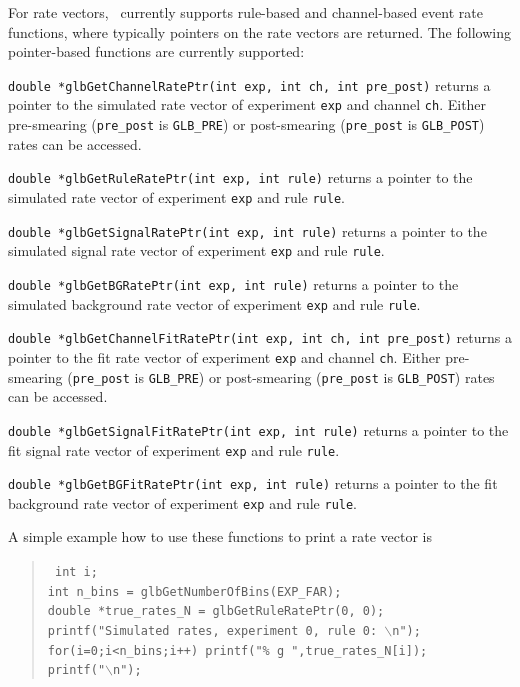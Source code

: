 For rate vectors, \GLOBES\ currently supports rule-based and channel-based event rate functions, where typically pointers on the rate vectors are returned. The following pointer-based functions are currently supported:
\begin{function}
{\tt double *glbGetChannelRatePtr(int exp, int ch, int pre\_post)} returns a 
pointer to the simulated rate vector of experiment {\tt exp} and channel {\tt ch}. Either
pre-smearing ({\tt pre\_post} is {\tt GLB\_PRE}) or post-smearing ({\tt pre\_post} is {\tt GLB\_POST})
rates can be accessed.
\end{function}
\begin{function}
{\tt double *glbGetRuleRatePtr(int exp, int rule)} returns a 
pointer to the simulated rate vector of experiment {\tt exp} and rule {\tt rule}.
\end{function}
\begin{function}
{\tt double *glbGetSignalRatePtr(int exp, int rule)} returns a 
pointer to the simulated signal rate vector of experiment {\tt exp} and rule {\tt rule}.
\end{function}
\begin{function}
{\tt double *glbGetBGRatePtr(int exp, int rule)} returns a 
pointer to the simulated background rate vector of experiment {\tt exp} and rule {\tt rule}.
\end{function}
\begin{function}
{\tt double *glbGetChannelFitRatePtr(int exp, int ch, int pre\_post)} returns a 
pointer to the fit rate vector of experiment {\tt exp} and channel {\tt ch}. Either
pre-smearing ({\tt pre\_post} is {\tt GLB\_PRE}) or post-smearing ({\tt pre\_post} is {\tt GLB\_POST})
rates can be accessed.
\end{function}
\begin{function}
{\tt double *glbGetSignalFitRatePtr(int exp, int rule)} returns a 
pointer to the fit signal rate vector of experiment {\tt exp} and rule {\tt rule}.
\end{function}
\begin{function}
{\tt double *glbGetBGFitRatePtr(int exp, int rule)} returns a 
pointer to the fit background rate vector of experiment {\tt exp} and rule {\tt rule}.
\end{function}
A simple example how to use these functions to print a rate vector is
\begin{quote}
{\tt
 int i; \\
   int n\_bins = glbGetNumberOfBins(EXP\_FAR); \\
  double *true\_rates\_N = glbGetRuleRatePtr(0, 0); \\
  printf("Simulated rates, experiment 0, rule 0: $\backslash$n"); \\
  for(i=0;i<n\_bins;i++) printf("\% g ",true\_rates\_N[i]); \\
  printf("$\backslash$n");
}
\end{quote}

